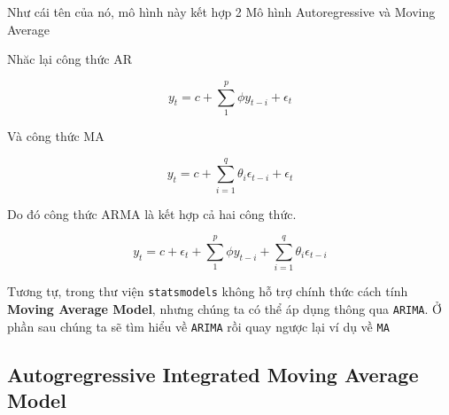 \documentclass[
]{book}
\begin{document}
Như cái tên của nó, mô hình này kết hợp 2 Mô hình Autoregressive và Moving Average

Nhăc lại công thức AR

\[
y_t = c + \sum^{p}_{1}\phi y_{t-i} + \epsilon_t
\]

Và công thức MA

\[
y_t = c  + \sum^{q}_{i=1}\theta_{i}\epsilon_{t-i} +  \epsilon_t
\]

Do đó công thức ARMA là kết hợp cả hai công thức.

\[
y_t = c + \epsilon_t + \sum^{p}_{1}\phi y_{t-i}  + \sum^{q}_{i=1}\theta_{i}\epsilon_{t-i}
\]

Tương tự, trong thư viện \texttt{statsmodels} không hỗ trợ chính thức cách tính \textbf{Moving Average Model}, nhưng chúng ta có thể áp dụng thông qua \texttt{ARIMA}. Ở phần sau chúng ta sẽ tìm hiểu về \texttt{ARIMA} rồi quay ngược lại ví dụ về \texttt{MA}

\subsection{Autogregressive Integrated Moving Average Model}\label{autogregressive-integrated-moving-average-model}

\printindex
\end{document}
